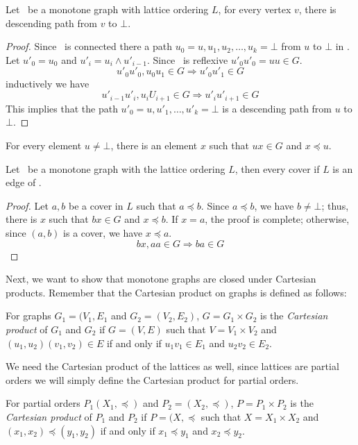 \begin{lemma}
Let \mG\ be a monotone graph with lattice ordering \(L\),
for every vertex \(v\), there is descending path from
\(v\) to \(\bot\)\@.
\end{lemma}

\begin{proof}
Since \mG\ is connected there a path \(u_0=u,u_1,u_2,\dotsc,u_k=\bot\) from \(u\) to 
\(\bot\) in \mG\@. Let \(u'_0=u_0\) and \(u'_i = u_i\wedge u'_{i-1}\)\@.
Since \mG\ is reflexive \(u'_0u'_0=uu \in G\)\@.
\[u'_0u'_0, u_0u_1 \in G \Rightarrow u'_0u'_1 \in G\]
inductively we have
\[u'_{i-1}u'_i, u_iU_{i+1} \in G \Rightarrow u'_iu'_{i+1} \in G\]
This implies that the path \(u'_0=u,u'_1,\dotsc,u'_k=\bot\) is a descending path from 
\(u\) to \(\bot\)\@.
\end{proof}

\begin{cor}
For every element \(u \neq \bot\),
there is an element \(x\) such that \(ux \in G\) and \(x \preceq u\)\@.
\end{cor}

\begin{lemma}
Let \mG\ be a monotone graph with the lattice ordering \(L\), then every cover
if \(L\) is an edge of \mG\@.
\end{lemma}

\begin{proof}
Let \(a,b\) be a cover in \(L\) such that \(a \preceq b\)\@.
Since \(a \preceq b\), we have \(b \neq \bot\); thus,
there is \(x\) such that \(bx \in G\) and \(x\preceq b\)\@.
If \(x=a\), the proof is complete; otherwise, since \((a,b)\) is a cover, we have \(x\preceq a\).
\[bx,aa \in G \Rightarrow ba \in G\]\@
\end{proof}

Next, we want to show that monotone graphs are closed under Cartesian products.
Remember that the Cartesian product on graphs is defined as follows:
\begin{defi} 
For graphs \(G_1=(V_1,E_1\) and \(G_2=(V_2,E_2)\), \(G = G_1 \times G_2\)
is the \emph{Cartesian product} of \(G_1\) and \(G_2\) if \(G=(V,E)\)
such that \(V=V_1 \times V_2\) and \((u_1,u_2)(v_1,v_2) \in E\)
if and only if \(u_1v_1 \in E_1\) and \(u_2v_2 \in E_2\)\@.
\end{defi}

We need the Cartesian product of the lattices as well,
since lattices are partial orders we will simply define the Cartesian product
for partial orders.
\begin{defi} 
For partial orders \(P_1(X_1,\preceq)\) and \(P_2=(X_2,\preceq)\), 
\(P= P_1 \times P_2\) is the \emph{Cartesian product} of \(P_1\) and \(P_2\)
if \(P=(X,\preceq\) such that \(X=X_1\times X_2\) and \((x_1,x_2) \preceq (y_1,y_2)\)
if and only if \(x_1\preceq y_1\) and \(x_2\preceq y_2\)\@.
\end{defi}

